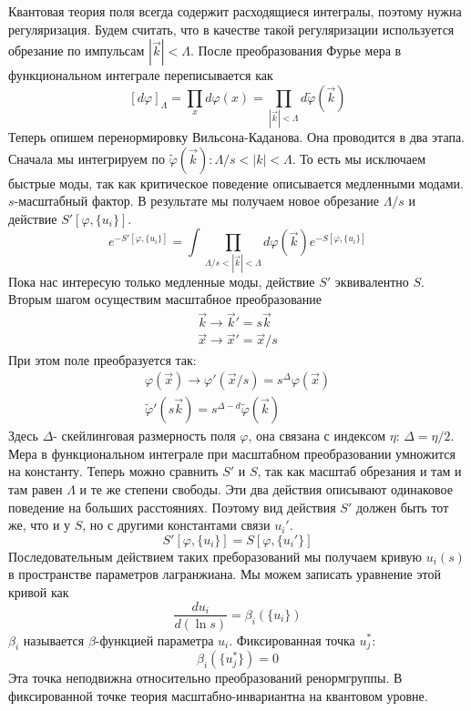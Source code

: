 \documentclass[a4paper,12pt]{article}
\theoremstyle{definition}
\theoremstyle{definition}
\theoremstyle{definition}
\begin{document}
Квантовая теория поля всегда содержит расходящиеся интегралы, поэтому нужна регуляризация. Будем считать, что в качестве такой регуляризации используется обрезание по импульсам $\left|\vec k\right|<\Lambda$. После преобразования Фурье мера в функциональном интеграле переписывается как
\begin{equation}
  \label{eq:66}
  [d\varphi]_{\Lambda}=\prod_x d\varphi(x)=\prod_{\left|\vec k\right|<\Lambda}d\tilde\varphi(\vec k)
\end{equation}
Теперь опишем перенормировку Вильсона-Каданова. Она проводится в два этапа. Сначала мы интегрируем по $\tilde\varphi(\vec k): \Lambda/s<\left|k\right|<\Lambda$. То есть мы исключаем быстрые моды, так как критическое поведение описывается медленными модами.  $s$-масштабный фактор. В результате мы получаем новое обрезание $\Lambda/s$ и действие $S'[\varphi,\{u_i\}]$.
\begin{equation}
  \label{eq:67}
  e^{-S'[\varphi,\{u_i\}]}=\int \prod_{\Lambda/s<\left|\vec k\right|<\Lambda}d\varphi(\vec k)e^{-S[\varphi,\{u_i\}]}
\end{equation}
Пока нас интересую только медленные моды, действие $S'$ эквивалентно $S$. Вторым шагом осуществим масштабное преобразование
\begin{eqnarray}
  \label{eq:68}
  \vec k \to \vec k'=s \vec k\\
  \vec x\to \vec x'=\vec x/s
\end{eqnarray}
При этом поле преобразуется так:
\begin{eqnarray}
  \label{eq:69}
  \varphi(\vec x)\to \varphi'(\vec x/s)=s^{\Delta}\varphi (\vec x)\\
  \tilde\varphi'(s\vec k)=s^{\Delta-d}\tilde\varphi (\vec k)
\end{eqnarray}
Здесь $\Delta$- скейлинговая размерность поля $\varphi$, она связана с индексом $\eta$: $\Delta=\eta/2$. Мера в функциональном интеграле при масштабном преобразовании умножится на константу. Теперь можно сравнить $S'$ и $S$, так как масштаб обрезания и там и там равен $\Lambda$ и те же степени свободы. Эти два действия описывают одинаковое поведение на больших расстояниях. Поэтому вид действия $S'$ должен быть тот же, что и у $S$, но с другими константами связи $u_i'$.
\begin{equation}
  \label{eq:70}
  S'[\varphi,\{u_i\}]=S[\varphi,\{u_i'\}]
\end{equation}
Последовательным действием таких преборазований мы получаем кривую $u_i(s)$ в пространстве параметров лагранжиана.  Мы можем записать уравнение этой кривой как
\begin{equation}
  \label{eq:71}
  \frac{du_i}{d(\ln s)}=\beta_i(\{u_i\})
\end{equation}
$\beta_i$ называется $\beta$-функцией параметра $u_i$. 
Фиксированная точка $u_j^{*}$:
\begin{equation}
  \label{eq:72}
  \beta_i(\{u^{*}_j\})=0
\end{equation}
Эта точка неподвижна относительно преобразований ренормгруппы. В фиксированной точке теория масштабно-инвариантна на квантовом уровне.
\end{document}
